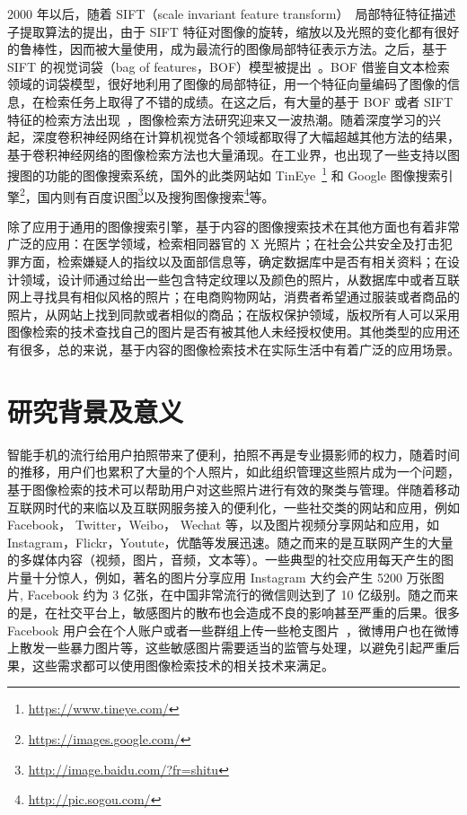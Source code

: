 2000 年以后，随着 SIFT（scale invariant feature transform）~\cite{Lowe2004DistinctiveIF}局部特征特征描述子提取算法的提出，由于 SIFT 特征对图像的旋转，缩放以及光照的变化都有很好的鲁棒性，因而被大量使用，成为最流行的图像局部特征表示方法。之后，基于 SIFT 的视觉词袋（bag of features，BOF）模型被提出~\cite{Sivic2003VideoGA}。BOF 借鉴自文本检索领域的词袋模型，很好地利用了图像的局部特征，用一个特征向量编码了图像的信息，在检索任务上取得了不错的成绩。在这之后，有大量的基于 BOF 或者 SIFT 特征的检索方法出现~\cite{Philbin2008LostIQ,Philbin2007ObjectRW,Mikulk2010LearningAF,Arandjelovic2012ThreeTE,Chum2007TotalRA}，图像检索方法研究迎来又一波热潮。随着深度学习的兴起，深度卷积神经网络在计算机视觉各个领域都取得了大幅超越其他方法的结果，基于卷积神经网络的图像检索方法也大量涌现。在工业界，也出现了一些支持以图搜图的功能的图像搜索系统，国外的此类网站如 TinEye~\footnote{\url{https://www.tineye.com/}} 和 Google 图像搜索引擎\footnote{\url{https://images.google.com/}}，国内则有百度识图\footnote{\url{http://image.baidu.com/?fr=shitu}}以及搜狗图像搜索\footnote{\url{http://pic.sogou.com/}}等。

除了应用于通用的图像搜索引擎，基于内容的图像搜索技术在其他方面也有着非常广泛的应用：在医学领域，检索相同器官的 X 光照片；在社会公共安全及打击犯罪方面，检索嫌疑人的指纹以及面部信息等，确定数据库中是否有相关资料；在设计领域，设计师通过给出一些包含特定纹理以及颜色的照片，从数据库中或者互联网上寻找具有相似风格的照片；在电商购物网站，消费者希望通过服装或者商品的照片，从网站上找到同款或者相似的商品；在版权保护领域，版权所有人可以采用图像检索的技术查找自己的图片是否有被其他人未经授权使用。其他类型的应用还有很多，总的来说，基于内容的图像检索技术在实际生活中有着广泛的应用场景。

\section{研究背景及意义}
智能手机的流行给用户拍照带来了便利，拍照不再是专业摄影师的权力，随着时间的推移，用户们也累积了大量的个人照片，如此组织管理这些照片成为一个问题，基于图像检索的技术可以帮助用户对这些照片进行有效的聚类与管理。伴随着移动互联网时代的来临以及互联网服务接入的便利化，一些社交类的网站和应用，例如 Facebook， Twitter，Weibo， Wechat 等，以及图片视频分享网站和应用，如 Instagram，Flickr，Youtute，优酷等发展迅速。随之而来的是互联网产生的大量的多媒体内容（视频，图片，音频，文本等）。一些典型的社交应用每天产生的图片量十分惊人，例如，著名的图片分享应用 Instagram 大约会产生 5200 万张图片, Facebook 约为 3 亿张，在中国非常流行的微信则达到了 10 亿级别。随之而来的是，在社交平台上，敏感图片的散布也会造成不良的影响甚至严重的后果。很多 Facebook 用户会在个人账户或者一些群组上传一些枪支图片~\cite{Drange2016,MELE2016FacebookBG}，微博用户也在微博上散发一些暴力图片等，这些敏感图片需要适当的监管与处理，以避免引起严重后果，这些需求都可以使用图像检索技术的相关技术来满足。

